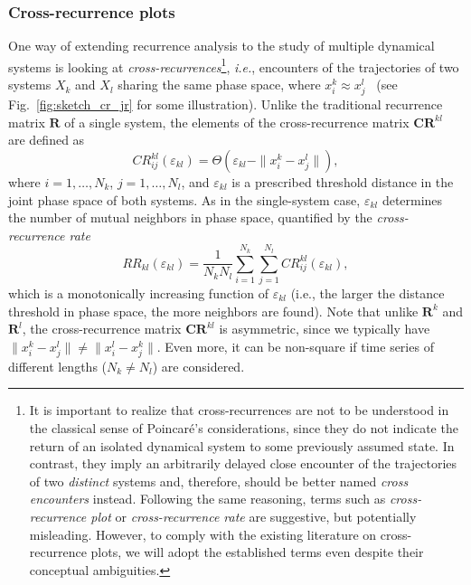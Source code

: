 		\subsubsection{Cross-recurrence plots}
        		One way of extending recurrence analysis to the study of multiple dynamical systems is looking at \emph{cross-recurrences}\footnote{It is important to realize that cross-recurrences are not to be understood in the classical sense of Poincar{\'e}'s considerations, since they do not indicate the return of an isolated dynamical system to some previously assumed state. In contrast, they imply an arbitrarily delayed close encounter of the trajectories of two \emph{distinct} systems and, therefore, should be better named \emph{cross encounters} instead. Following the same reasoning, terms such as \emph{cross-recurrence plot} or \emph{cross-recurrence rate} are suggestive, but potentially misleading. However, to comply with the existing literature on cross-recurrence plots, we will adopt the established terms even despite their conceptual ambiguities.}, \textit{i.e.}, encounters of the trajectories of two systems $X_k$ and $X_l$ sharing the same phase space, where $x_i^k \approx x_j^l$~\cite{marwan2002,Zbilut1998} (see Fig.~\ref{fig:sketch_cr_jr} for some illustration). Unlike the traditional recurrence matrix $\mathbf{R}$ of a single system, the elements of the cross-recurrence matrix $\mathbf{CR}^{kl}$ are defined as
\begin{equation}
CR_{ij}^{kl}(\varepsilon_{kl})=\Theta(\varepsilon_{kl} - \|x_i^k - x_j^l\|),
\end{equation}
where $i=1,\dots,N_k$, $j=1,\dots,N_l$, and $\varepsilon_{kl}$ is a prescribed threshold distance in the joint phase space of both systems. As in the single-system case, $\varepsilon_{kl}$ determines the number of mutual neighbors in phase space, quantified by the \emph{cross-recurrence rate}
\begin{equation}
RR_{kl}(\varepsilon_{kl})=\frac{1}{N_k N_l}\sum_{i=1}^{N_k} \sum_{j=1}^{N_l} CR_{ij}^{kl}(\varepsilon_{kl}),
\label{eq:crr}
\end{equation}
\noindent
which is a monotonically increasing function of $\varepsilon_{kl}$ (i.e., the larger the distance threshold in phase space, the more neighbors are found). Note that unlike $\mathbf{R}^k$ and $\mathbf{R}^l$, the cross-recurrence matrix $\mathbf{CR}^{kl}$ is asymmetric, since we typically have $\|x_i^k - x_j^l\|\neq\|x_i^l - x_j^k\|$. Even more, it can be non-square if time series of different lengths ($N_k\neq N_l$) are considered.
        
